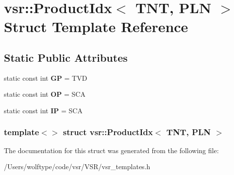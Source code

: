 \hypertarget{structvsr_1_1_product_idx_3_01_t_n_t_00_01_p_l_n_01_4}{\section{vsr\-:\-:Product\-Idx$<$ T\-N\-T, P\-L\-N $>$ Struct Template Reference}
\label{structvsr_1_1_product_idx_3_01_t_n_t_00_01_p_l_n_01_4}
}
\subsection*{Static Public Attributes}
\begin{DoxyCompactItemize}
\item 
\hypertarget{structvsr_1_1_product_idx_3_01_t_n_t_00_01_p_l_n_01_4_a9910ae6e971a497fda9129538167ffd7}{static const int {\bfseries G\-P} = T\-V\-D}\label{structvsr_1_1_product_idx_3_01_t_n_t_00_01_p_l_n_01_4_a9910ae6e971a497fda9129538167ffd7}

\item 
\hypertarget{structvsr_1_1_product_idx_3_01_t_n_t_00_01_p_l_n_01_4_a96bc094541713ff9126d102f4eb34a62}{static const int {\bfseries O\-P} = S\-C\-A}\label{structvsr_1_1_product_idx_3_01_t_n_t_00_01_p_l_n_01_4_a96bc094541713ff9126d102f4eb34a62}

\item 
\hypertarget{structvsr_1_1_product_idx_3_01_t_n_t_00_01_p_l_n_01_4_ac4ed8c267421ae11bc6174e67fe13e01}{static const int {\bfseries I\-P} = S\-C\-A}\label{structvsr_1_1_product_idx_3_01_t_n_t_00_01_p_l_n_01_4_ac4ed8c267421ae11bc6174e67fe13e01}

\end{DoxyCompactItemize}
\subsubsection*{template$<$$>$ struct vsr\-::\-Product\-Idx$<$ T\-N\-T, P\-L\-N $>$}



The documentation for this struct was generated from the following file\-:\begin{DoxyCompactItemize}
\item 
/\-Users/wolftype/code/vsr/\-V\-S\-R/vsr\-\_\-templates.\-h\end{DoxyCompactItemize}
